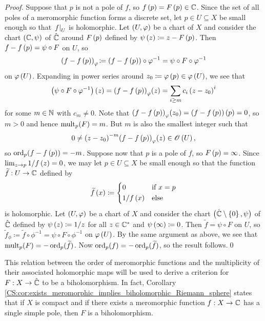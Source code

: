 \documentclass[../Moduli_Spaces_of_Riemann_Surfaces.tex]{subfiles}
\begin{document}
    \begin{proof}
        Suppose that $p$ is not a pole of $f$, so $f\left(p\right)=F\left(p\right)\in\mathbb{C}$. Since the set of all poles of a meromorphic function forms a discrete set, let $p\in U\subseteq X$ be small enough so that $\left.f\right|_U$ is holomorphic. Let $\left(U,\varphi\right)$ be a chart of $X$ and consider the chart $\left(\mathbb{C},\psi\right)$ of $\hat{\mathbb{C}}$ around $F\left(p\right)$ defined by $\psi\left(z\right)\coloneqq z-F\left(p\right)$. Then $f-f\left(p\right)=\psi\circ F$ on $U$, so
        \begin{equation*}
            \left(f-f\left(p\right)\right)_\varphi\!\coloneqq\left(f-f\left(p\right)\right)\circ\varphi^{-1}=\psi\circ F\circ\varphi^{-1}
        \end{equation*}
        on $\varphi\left(U\right)$. Expanding in power series around $z_0\coloneqq\varphi\left(p\right)\in\varphi\left(U\right)$, we see that
        \begin{equation*}
            \left(\psi\circ F\circ\varphi^{-1}\right)\left(z\right)=\left(f-f\left(p\right)\right)_\varphi\!\left(z\right)=\sum_{i\geq m}c_i\left(z-z_0\right)^i
        \end{equation*}
        for some $m\in\mathbb{N}$ with $c_m\neq0$. Note that $\left(f-f\left(p\right)\right)_\varphi\!\left(z_0\right)=\left(f-f\left(p\right)\right)\left(p\right)=0$, so $m>0$ and hence $\operatorname{mult}_p\!\left(F\right)=m$. But $m$ is also the smallest integer such that
        \begin{equation*}
            0\neq\left(z-z_0\right)^{-m}\!\left(f-f\left(p\right)\right)_\varphi\!\left(z\right)\in\mathscr{O}\left(U\right),
        \end{equation*}
        so $\operatorname{ord}_p\!\left(f-f\left(p\right)\right)=-m$. Suppose now that $p$ is a pole of $f$, so $F\left(p\right)=\infty$. Since $\lim_{z\to p}1/f\left(z\right)=0$, we may let $p\in U\subseteq X$ be small enough so that the function $\widetilde{f}:U\to\mathbb{C}$ defined by
        \begin{equation*}
            \widetilde{f}\left(x\right)\coloneqq
            \begin{dcases}
                0 & \textrm{if }x=p \\
                1/f\left(x\right) & \textrm{else}
            \end{dcases}
        \end{equation*}
        is holomorphic. Let $\left(U,\varphi\right)$ be a chart of $X$ and consider the chart $\big(\hat{\mathbb{C}}\setminus\left\{0\right\},\psi\big)$ of $\hat{\mathbb{C}}$ defined by $\psi\left(z\right)\coloneqq1/z$ for all $z\in\mathbb{C}^\ast$ and $\psi\left(\infty\right)\coloneqq0$. Then $\widetilde{f}=\psi\circ F$ on $U$, so $\widetilde{f}_\phi\!\coloneqq\widetilde{f}\circ\phi^{-1}=\psi\circ F\circ\phi^{-1}$ on $\varphi\left(U\right)$. By the same argument as above, we see that $\operatorname{mult}_p\!\left(F\right)=-\operatorname{ord}_p(\widetilde{f})$. Now $\operatorname{ord}_p\!\left(f\right)=-\operatorname{ord}_p(\widetilde{f})$, so the result follows.\qed
    \end{proof}
    \begin{remark}
        This relation between the order of meromorphic functions and the multiplicity of their associated holomorphic maps will be used to derive a criterion for $F:X\to\hat{\mathbb{C}}$ to be a biholomorphism. In fact, Corollary \ref{CS:cor:exists_meromorphic_implies_biholomorphic_Riemann_sphere} states that if $X$ is compact and if there exists a meromorphic function $f:X\to\mathbb{C}$ has a single simple pole, then $F$ is a biholomorphism.\exqed
    \end{remark}
\end{document}
